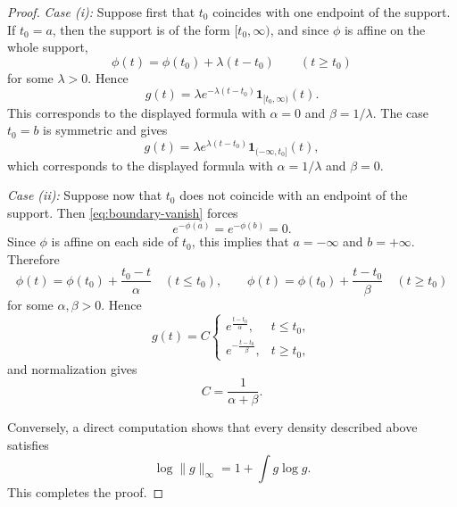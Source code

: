 \documentclass{article}
\theoremstyle{plain}
\newtheorem{proposition}[theorem]{Proposition}
\theoremstyle{definition}
\newcommand{\1}{\mathbf 1}
\begin{document}
\begin{proof}
\smallskip

\noindent\emph{Case (i):} Suppose first that $t_0$ coincides with one endpoint of the support. If
$t_0=a$, then the support is of the form $[t_0,\infty)$, and since $\phi$ is
affine on the whole support,
\[
\phi(t)=\phi(t_0)+\lambda(t-t_0)
\qquad (t\ge t_0)
\]
for some $\lambda>0$. Hence
\[
g(t)=\lambda e^{-\lambda(t-t_0)}\mathbf 1_{[t_0,\infty)}(t).
\]
This corresponds to the displayed formula with $\alpha=0$ and
$\beta=1/\lambda$. The case $t_0=b$ is symmetric and gives
\[
g(t)=\lambda e^{\lambda(t-t_0)}\mathbf 1_{(-\infty,t_0]}(t),
\]
which corresponds to the displayed formula with $\alpha=1/\lambda$ and
$\beta=0$.

\smallskip

\noindent\emph{Case (ii):} Suppose now that $t_0$ does not coincide with an endpoint of the support. Then
\eqref{eq:boundary-vanish} forces
\[
e^{-\phi(a)}=e^{-\phi(b)}=0.
\]
Since $\phi$ is affine on each side of $t_0$, this implies that $a=-\infty$ and
$b=+\infty$. Therefore
\[
\phi(t)=\phi(t_0)+\frac{t_0-t}{\alpha}
\quad (t\le t_0),
\qquad
\phi(t)=\phi(t_0)+\frac{t-t_0}{\beta}
\quad (t\ge t_0)
\]
for some $\alpha,\beta>0$. Hence
\[
g(t)=C
\begin{cases}
e^{\frac{t-t_0}{\alpha}}, & t\le t_0,\\[1mm]
e^{-\frac{t-t_0}{\beta}}, & t\ge t_0,
\end{cases}
\]
and normalization gives
\[
C=\frac{1}{\alpha+\beta}.
\]

Conversely, a direct computation shows that every density described above
satisfies
\[
\log\|g\|_\infty = 1+\int g\log g .
\]
This completes the proof.
\end{proof}


\end{document}
